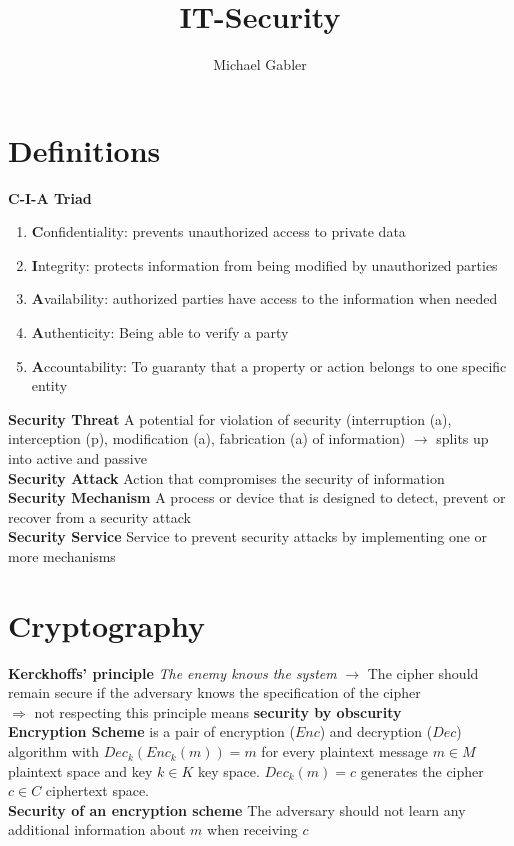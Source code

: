 \documentclass[12pt]{article}
\begin{document}
	
	
	\title{IT-Security}%
	\author{Michael Gabler} %
	
	\maketitle
	
	\section{Definitions}
	
	\textbf{C-I-A Triad}
	\begin{enumerate}
		\item \textbf{C}onfidentiality: prevents unauthorized access to private data
		\item \textbf{I}ntegrity: protects information from being modified by unauthorized parties
		\item \textbf{A}vailability: authorized parties have access to the information when needed
		\item \textbf{A}uthenticity: Being able to verify a party
		\item \textbf{A}ccountability: To guaranty that a property or action belongs to one specific entity
	\end{enumerate}
	\textbf{Security Threat} A potential for violation of security (interruption (a), interception (p), modification (a), fabrication (a) of information) $\rightarrow$ splits up into active and passive\\
	\textbf{Security Attack} Action that compromises the security of information\\
	\textbf{Security Mechanism} A process or device that is designed to detect, prevent or recover from a security attack\\
	\textbf{Security Service} Service to prevent security attacks by implementing one or more mechanisms
	
	\section{Cryptography}
	\textbf{Kerckhoffs' principle} \textit{The enemy knows the system} $\rightarrow$ The cipher should remain secure if the adversary knows the specification of the cipher\\
	$\Rightarrow$ not respecting this principle means \textbf{security by obscurity}\\
	\textbf{Encryption Scheme} is a pair of encryption ($Enc$) and decryption ($Dec$) algorithm with $Dec_k(Enc_k(m)) = m$ for every plaintext message $m \in M$ plaintext space and key $k \in K$ key space. $Dec_k(m) = c$ generates the cipher $c \in C$ ciphertext space.\\
	\textbf{Security of an encryption scheme} The adversary should not learn any additional information about $m$ when receiving $c$
	
\end{document}
